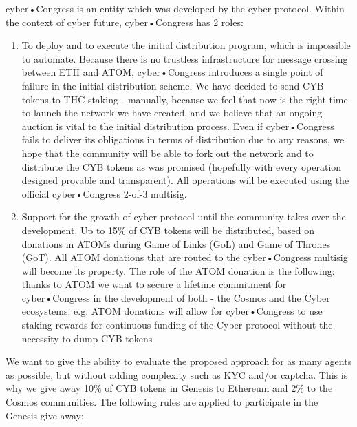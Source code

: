 \documentclass[8pt,oneside]{amsart}
\begin{document}
\begin{Abstract}
cyber•Congress is an entity which was developed by the cyber protocol. Within the context of cyber future, cyber•Congress has 2 roles:
\begin{enumerate}
 \item To deploy and to execute the initial distribution program, which is impossible to automate. Because there is no trustless infrastructure for message crossing between ETH and ATOM, cyber•Congress introduces a single point of failure in the initial distribution scheme. We have decided to send CYB tokens to THC staking - manually, because we feel that now is the right time to launch the network we have created, and we believe that an ongoing auction is vital to the initial distribution process. Even if cyber•Congress fails to deliver its obligations in terms of distribution due to any reasons, we hope that the community will be able to fork out the network and to distribute the CYB tokens as was promised (hopefully with every operation designed provable and transparent). All operations will be executed using the official cyber•Congress 2-of-3 multisig.
 \item Support for the growth of cyber protocol until the community takes over the development. Up to 15\% of CYB tokens will be distributed, based on donations in ATOMs during Game of Links (GoL) and Game of Thrones (GoT). All ATOM donations that are routed to the cyber•Congress multisig will become its property. The role of the ATOM donation is the following: thanks to ATOM we want to secure a lifetime commitment for cyber•Congress in the development of both - the Cosmos and the Cyber ecosystems. e.g. ATOM donations will allow for cyber•Congress to use staking rewards for continuous funding of the Cyber protocol without the necessity to dump CYB tokens
\end{enumerate}

We want to give the ability to evaluate the proposed approach for as many agents as possible, but without adding complexity such as KYC and/or captcha. This is why we give away 10\% of CYB tokens in Genesis to Ethereum and 2\% to the Cosmos communities. The following rules are applied to participate in the Genesis give away:


\end{Abstract}
\end{document}
